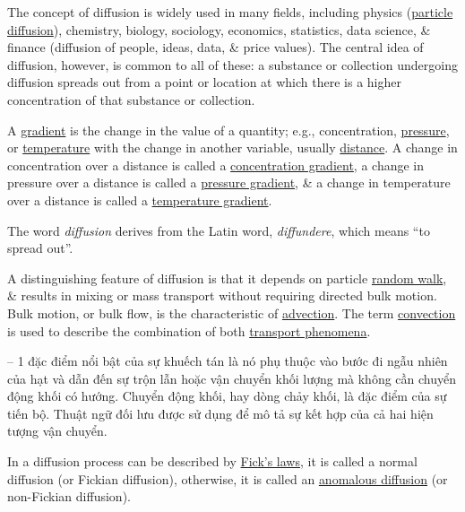 \documentclass{article}
\begin{document}
The concept of diffusion is widely used in many fields, including physics (\href{https://en.wikipedia.org/wiki/Molecular_diffusion}{particle diffusion}), chemistry, biology, sociology, economics, statistics, data science, \& finance (diffusion of people, ideas, data, \& price values). The central idea of diffusion, however, is common to all of these: a substance or collection undergoing diffusion spreads out from a point or location at which there is a higher concentration of that substance or collection.

A \href{https://en.wikipedia.org/wiki/Gradient}{gradient} is the change in the value of a quantity; e.g., concentration, \href{https://en.wikipedia.org/wiki/Pressure}{pressure}, or \href{https://en.wikipedia.org/wiki/Temperature}{temperature} with the change in another variable, usually \href{https://en.wikipedia.org/wiki/Distance}{distance}. A change in concentration over a distance is called a \href{https://en.wikipedia.org/wiki/Molecular_diffusion}{concentration gradient}, a change in pressure over a distance is called a \href{https://en.wikipedia.org/wiki/Pressure_gradient}{pressure gradient}, \& a change in temperature over a distance is called a \href{https://en.wikipedia.org/wiki/Temperature_gradient}{temperature gradient}.

The word {\it diffusion} derives from the Latin word, {\it diffundere}, which means ``to spread out''.

A distinguishing feature of diffusion is that it depends on particle \href{https://en.wikipedia.org/wiki/Random_walk}{random walk}, \& results in mixing or mass transport without requiring directed bulk motion. Bulk motion, or bulk flow, is the characteristic of \href{https://en.wikipedia.org/wiki/Advection}{advection}. The term \href{https://en.wikipedia.org/wiki/Convection}{convection} is used to describe the combination of both \href{https://en.wikipedia.org/wiki/Transport_phenomena}{transport phenomena}.

-- 1 đặc điểm nổi bật của sự khuếch tán là nó phụ thuộc vào bước đi ngẫu nhiên của hạt và dẫn đến sự trộn lẫn hoặc vận chuyển khối lượng mà không cần chuyển động khối có hướng. Chuyển động khối, hay dòng chảy khối, là đặc điểm của sự tiến bộ. Thuật ngữ đối lưu được sử dụng để mô tả sự kết hợp của cả hai hiện tượng vận chuyển.

In a diffusion process can be described by \href{https://en.wikipedia.org/wiki/Fick%27s_laws_of_diffusion}{Fick's laws}, it is called a normal diffusion (or Fickian diffusion), otherwise, it is called an \href{https://en.wikipedia.org/wiki/Anomalous_diffusion}{anomalous diffusion} (or non-Fickian diffusion).
\end{document}
